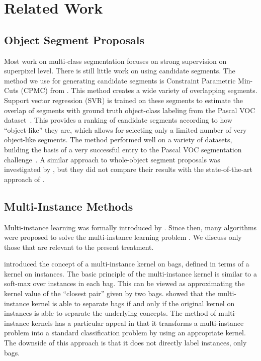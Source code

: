\section{Related Work}
\subsection{Object Segment Proposals}\label{related_segments}
Most work on multi-class segmentation focuses on strong supervision on
superpixel level. There is still little work on using candidate segments.  The
method we use for generating candidate segments is Constraint Parametric
Min-Cuts (CPMC) from \citet{carreira2010constrained}.  This method creates a
wide variety of overlapping segments. Support vector regression (SVR) is
trained on these segments to estimate the overlap of segments with ground truth
object-class labeling from the Pascal VOC dataset~\citep{pascal}. This provides
a ranking of candidate segments according to how ``object-like'' they are,
which allows for selecting only a limited number of very object-like segments.
The method performed well on a variety of datasets, building the basis of
a very successful entry to the Pascal VOC segmentation
challenge~\citep{li2010object}. A similar approach to whole-object segment
proposals was investigated by \citet{endres2010category}, but they did not compare
their results with the state-of-the-art approach of \citet{carreira2010constrained}.

\subsection{Multi-Instance Methods}
Multi-instance learning was formally introduced by \citet{dietterich1997solving}.
Since then, many algorithms were proposed to solve the multi-instance learning problem
\citep{andrews2003support,gaertner2002multi,zhou2009multi,li2009convex,zhang2002dd,mangasarian2008multiple,leistner2010miforests,chen2006miles}.
We discuss only those that are relevant to the present treatment.

\citet{gaertner2002multi} introduced the concept of a multi-instance
kernel on bags, defined in terms of a kernel on instances. 
The basic principle of the multi-instance kernel is similar to a soft-max over instances in
each bag. This can be viewed as approximating the kernel value of the ``closest pair'' given by two bags. \citet{gaertner2002multi} showed that the multi-instance kernel
is able to separate bags if and only if the original kernel on instances is able to separate the underlying concepts.
The method of multi-instance kernels has a particular appeal in that it transforms a multi-instance problem into a standard
classification problem by using an appropriate kernel. The downside of this approach is that it does
not directly label instances, only bags.

